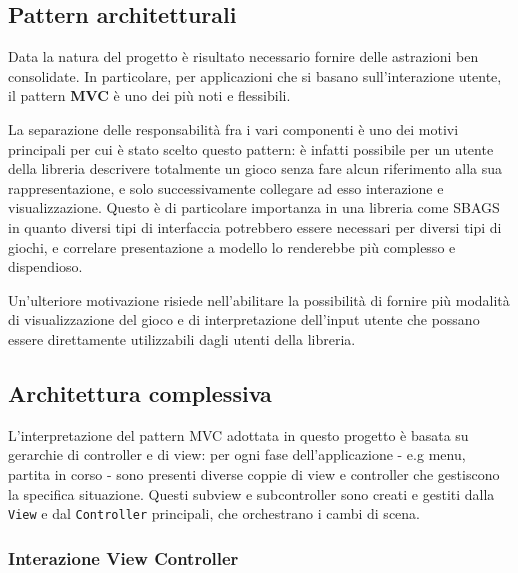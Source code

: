 \subsection{Pattern architetturali}
Data la natura del progetto è risultato necessario fornire delle astrazioni ben consolidate.
%
In particolare, per applicazioni che si basano sull'interazione utente, il pattern  \textbf{MVC} è uno dei più noti e flessibili.

La separazione delle responsabilità fra i vari componenti è uno dei motivi principali per cui è stato scelto questo pattern: è infatti possibile per un utente della libreria descrivere totalmente un gioco senza fare alcun riferimento alla sua rappresentazione, e solo successivamente collegare ad esso interazione e visualizzazione.
%
Questo è di particolare importanza in una libreria come SBAGS in quanto diversi tipi di interfaccia potrebbero essere necessari per diversi tipi di giochi, e correlare presentazione a modello lo renderebbe più complesso e dispendioso.

Un'ulteriore motivazione risiede nell'abilitare la possibilità di fornire più modalità di visualizzazione del gioco e di interpretazione dell'input utente che possano essere direttamente utilizzabili dagli utenti della libreria. 

\subsection{Architettura complessiva}
L'interpretazione del pattern MVC adottata in questo progetto è basata su gerarchie di controller e di view: per ogni fase dell'applicazione - e.g menu, partita in corso - sono presenti diverse coppie di view e controller che gestiscono la specifica situazione.
%
Questi subview e subcontroller sono creati e gestiti dalla \texttt{View} e dal \texttt{Controller} principali, che orchestrano i cambi di scena.

\subsubsection{}

\subsubsection{Interazione View Controller}

